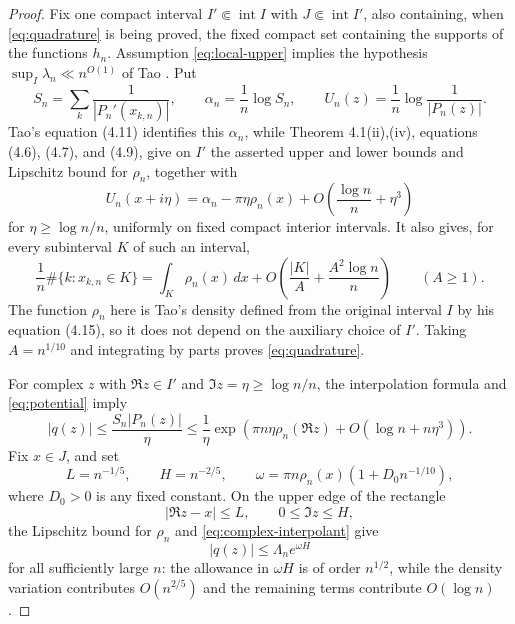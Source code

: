 \documentclass[11pt]{article}
\numberwithin{equation}{section}
\begin{document}
\begin{proof}
Fix one compact interval \(I'\Subset\operatorname{int}I\) with
\(J\Subset\operatorname{int}I'\), also containing, when
\eqref{eq:quadrature} is being proved, the fixed compact set containing the
supports of the functions \(h_n\). Assumption \eqref{eq:local-upper}
implies the hypothesis \(\sup_I\lambda_n\ll n^{O(1)}\) of Tao
\cite[Theorem 4.1, equation (4.1)]{Tao}. Put
\[
 S_n=\sum_k\frac1{|P_n'(x_{k,n})|},\qquad
 \alpha_n=\frac1n\log S_n,\qquad
 U_n(z)=\frac1n\log\frac1{|P_n(z)|}.
\]
Tao's equation (4.11) identifies this \(\alpha_n\), while
Theorem 4.1(ii),(iv), equations (4.6), (4.7), and (4.9), give on \(I'\)
the asserted upper and lower bounds and Lipschitz bound for \(\rho_n\),
together with
\begin{equation}\label{eq:potential}
 U_n(x+i\eta)=\alpha_n-\pi\eta\rho_n(x)
              +O\!\left(\frac{\log n}{n}+\eta^3\right)
\end{equation}
for \(\eta\ge\log n/n\), uniformly on fixed compact interior intervals. It
also gives, for every subinterval \(K\) of such an interval,
\begin{equation}\label{eq:discrepancy}
 \frac1n\#\{k:x_{k,n}\in K\}
 =\int_K\rho_n(x)\,dx
   +O\!\left(\frac{|K|}{A}+\frac{A^2\log n}{n}\right)
 \qquad(A\ge1).
\end{equation}
The function \(\rho_n\) here is Tao's density defined from the original
interval \(I\) by his equation (4.15), so it does not depend on the
auxiliary choice of \(I'\). Taking \(A=n^{1/10}\) and integrating by
parts proves \eqref{eq:quadrature}.

For complex \(z\) with \(\Re z\in I'\) and
\(\Im z=\eta\ge\log n/n\), the
interpolation formula and \eqref{eq:potential} imply
\begin{equation}\label{eq:complex-interpolant}
 |q(z)|\le \frac{S_n|P_n(z)|}{\eta}
 \le \frac1\eta
       \exp\!\left(\pi n\eta\rho_n(\Re z)
                       +O(\log n+n\eta^3)\right).
\end{equation}
Fix \(x\in J\), and set
\[
 L=n^{-1/5},\qquad H=n^{-2/5},\qquad
 \omega=\pi n\rho_n(x)(1+D_0n^{-1/10}),
\]
where \(D_0>0\) is any fixed constant. On the upper edge of the
rectangle
\[
 |\Re z-x|\le L,\qquad 0\le\Im z\le H,
\]
the Lipschitz bound for \(\rho_n\) and \eqref{eq:complex-interpolant} give
\[
 |q(z)|\le\Lambda_n e^{\omega H}
\]
for all sufficiently large \(n\): the allowance in \(\omega H\) is of order
\(n^{1/2}\), while the density variation contributes \(O(n^{2/5})\) and the
remaining terms contribute \(O(\log n)\).


\end{proof}
\end{document}
